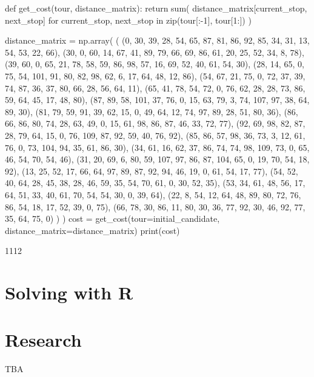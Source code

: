 \begin{pyin}
def get_cost(tour, distance_matrix):
    return sum(
        distance_matrix[current_stop, next_stop]
        for current_stop, next_stop in
        zip(tour[:-1], tour[1:])
    )
\end{pyin}

\begin{pyin}
distance_matrix = np.array(
    (
    (0, 30, 39, 28, 54, 65, 87, 81, 86, 92, 85, 34, 31, 13, 54, 53, 22, 66),
    (30, 0, 60, 14, 67, 41, 89, 79, 66, 69, 86, 61, 20, 25, 52, 34, 8, 78),
    (39, 60, 0, 65, 21, 78, 58, 59, 86, 98, 57, 16, 69, 52, 40, 61, 54, 30),
    (28, 14, 65, 0, 75, 54, 101, 91, 80, 82, 98, 62, 6, 17, 64, 48, 12, 86),
    (54, 67, 21, 75, 0, 72, 37, 39, 74, 87, 36, 37, 80, 66, 28, 56, 64, 11),
    (65, 41, 78, 54, 72, 0, 76, 62, 28, 28, 73, 86, 59, 64, 45, 17, 48, 80),
    (87, 89, 58, 101, 37, 76, 0, 15, 63, 79, 3, 74, 107, 97, 38, 64, 89, 30),
    (81, 79, 59, 91, 39, 62, 15, 0, 49, 64, 12, 74, 97, 89, 28, 51, 80, 36),
    (86, 66, 86, 80, 74, 28, 63, 49, 0, 15, 61, 98, 86, 87, 46, 33, 72, 77),
    (92, 69, 98, 82, 87, 28, 79, 64, 15, 0, 76, 109, 87, 92, 59, 40, 76, 92),
    (85, 86, 57, 98, 36, 73, 3, 12, 61, 76, 0, 73, 104, 94, 35, 61, 86, 30),
    (34, 61, 16, 62, 37, 86, 74, 74, 98, 109, 73, 0, 65, 46, 54, 70, 54, 46),
    (31, 20, 69, 6, 80, 59, 107, 97, 86, 87, 104, 65, 0, 19, 70, 54, 18, 92),
    (13, 25, 52, 17, 66, 64, 97, 89, 87, 92, 94, 46, 19, 0, 61, 54, 17, 77),
    (54, 52, 40, 64, 28, 45, 38, 28, 46, 59, 35, 54, 70, 61, 0, 30, 52, 35),
    (53, 34, 61, 48, 56, 17, 64, 51, 33, 40, 61, 70, 54, 54, 30, 0, 39, 64),
    (22, 8, 54, 12, 64, 48, 89, 80, 72, 76, 86, 54, 18, 17, 52, 39, 0, 75),
    (66, 78, 30, 86, 11, 80, 30, 36, 77, 92, 30, 46, 92, 77, 35, 64, 75, 0)
    )
)
cost = get_cost(tour=initial_candidate, distance_matrix=distance_matrix)
print(cost)
\end{pyin}

\begin{pyout}
1112
\end{pyout}


\section{Solving with R}\label{sec:solving-with-R}

\section{Research}\label{sec:research}

TBA

